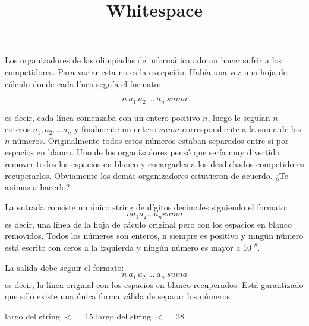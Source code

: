 \documentclass{oci}
\title{Whitespace}
\begin{document}
\begin{problemDescription}
Los organizadores de las olimpiadas de informática adoran hacer sufrir a los competidores. Para variar esta no es la excepción. Había una vez una hoja de cálculo donde cada línea seguía el formato:

$$n\ a_1\ a_2\ \dots\ a_n\ suma$$

es decir, cada línea comenzaba con un entero positivo $n$, luego le seguían $n$ enteros $a_1, a_2, \dots a_n$ y finalmente un entero $suma$ correspondiente a la suma de los $n$ números. Originalmente todos estos números estaban separados entre sí por espacios en blanco. Uno de los organizadores pensó que sería muy divertido remover todos los espacios en blanco y encargarles a los desdichados competidores recuperarlos. Obviamente los demás organizadores estuvieron de acuerdo. ¿Te animas a hacerlo?
\end{problemDescription}

\begin{inputDescription}
La entrada consiste un único string de dígitos decimales siguiendo el formato:
$$n a_1 a_2 \dots a_n suma$$
es decir, una línea de la hoja de cáculo original pero con los espacios en blanco removidos. Todos los números son enteros, n siempre es positivo y ningún número está escrito con ceros a la izquierda y ningún número es mayor a $10^{18}$.
\end{inputDescription}

\begin{outputDescription}
La salida debe seguir el formato:
$$n\ a_1\ a_2\ \dots\ a_n\ suma$$
es decir, la línea original con los espacios en blanco recuperados. Está garantizado que sólo existe una única forma válida de separar los números.
\end{outputDescription}

\begin{scoreDescription}
   largo del string $<= 15$
   largo del string $<= 28$
\end{scoreDescription}

\begin{sampleDescription}
\end{sampleDescription}
\end{document}
